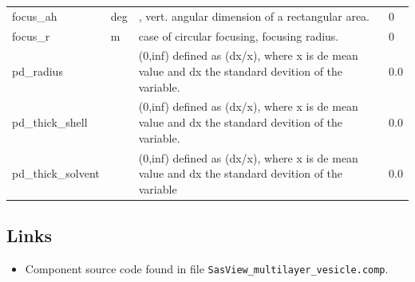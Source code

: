 \begin{longtable}{p{}p{}p{}p{}}
focus\_ah & deg & , vert. angular dimension of a rectangular area. & 0 \\
focus\_r & m & case of circular focusing, focusing radius. & 0 \\
pd\_radius &  & (0,inf) defined as (dx/x), where x is de mean value and dx the standard devition of the variable. & 0.0 \\
pd\_thick\_shell &  & (0,inf) defined as (dx/x), where x is de mean value and dx the standard devition of the variable. & 0.0 \\
pd\_thick\_solvent &  & (0,inf) defined as (dx/x), where x is de mean value and dx the standard devition of the variable & 0.0 \\
\bottomrule
\end{longtable}

\subsection*{Links}
\begin{itemize}
  \item Component source code found in file \texttt{SasView\_multilayer\_vesicle.comp}.
\end{itemize}
